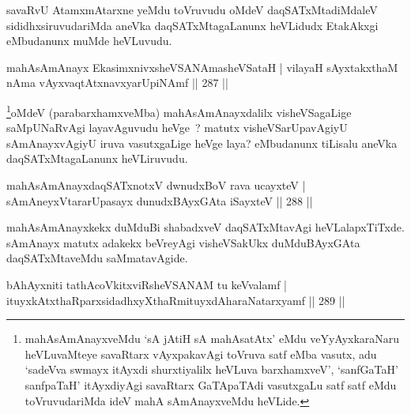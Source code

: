\begin{artha}
savaRvU AtamxmAtarxne yeMdu toVruvudu oMdeV daqSATxMtadiMdaleV sididhxsiruvudariMda aneVka daqSATxMtagaLanunx heVLidudx EtakAkxgi eMbudanunx muMde heVLuvudu.
\end{artha}

\begin{shl}
mahAsAmAnayx EkasimxnivxsheVSANAmasheVSataH |
vilayaH sAyxtakxthaM nAma vAyxvaqtAtxnavxyarUpiNAmf \hfill || 287 ||
\end{shl}

\begin{artha}
\footnote{mahAsAmAnayxveMdu `sA jAtiH sA mahAsatAtx' eMdu veYyAyxkaraNaru heVLuvaMteye savaRtarx vAyxpakavAgi toVruva satf eMba vasutx, adu `sadeVva swmayx itAyxdi shurxtiyalilx heVLuva barxhamxveV', `sanfGaTaH' sanfpaTaH' itAyxdiyAgi savaRtarx GaTApaTAdi vasutxgaLu satf satf eMdu toVruvudariMda ideV mahA sAmAnayxveMdu heVLide.}oMdeV (parabarxhamxveMba) mahAsAmAnayxdalilx visheVSagaLige saMpUNaRvAgi layavAguvudu heVge~? matutx visheVSarUpavAgiyU sAmAnayxvAgiyU iruva vasutxgaLige heVge laya? eMbudanunx tiLisalu aneVka daqSATxMtagaLanunx heVLiruvudu.
\end{artha}

\begin{shl}
mahAsAmAnayxdaqSATxnotxV dwnudxBoV rava ucayxteV |
sAmAneyxVtararUpasayx dunudxBAyxGAta iSayxteV \hfill || 288 ||
\end{shl}

\begin{artha}
mahAsAmAnayxkekx duMduBi shabadxveV daqSATxMtavAgi heVLalapxTiTxde. sAmAnayx matutx adakekx beVreyAgi visheVSakUkx duMduBAyxGAta daqSATxMtaveMdu saMmatavAgide.
\end{artha}

\begin{shl}
bAhAyxniti tathAcoVkitxviRsheVSANAM tu keVvalamf |
ituyxkAtxthaRparxsidadhxyXthaRmituyxdAharaNatarxyamf \hfill || 289 ||
\end{shl}

